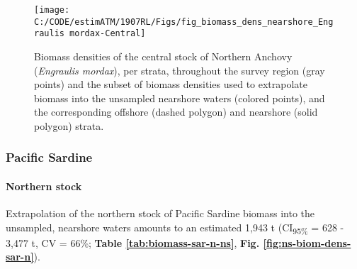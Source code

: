 \documentclass[]{article}
\let\oldparagraph\paragraph
\renewcommand{\paragraph}[1]{\oldparagraph{#1}\mbox{}}
\begin{document}
\newpage



\begin{figure}[H]

{\centering \texttt{[image: C:/CODE/estimATM/1907RL/Figs/fig\_biomass\_dens\_nearshore\_Engraulis mordax-Central]} 

}

\caption{Biomass densities of the central stock of Northern Anchovy (\emph{Engraulis mordax}), per strata, throughout the survey region (gray points) and the subset of biomass densities used to extrapolate biomass into the unsampled nearshore waters (colored points), and the corresponding offshore (dashed polygon) and nearshore (solid polygon) strata.}\label{fig:ns-biom-dens-anch-c}
\end{figure}

\newpage

\hypertarget{appendix-nearshore-biomass-sardine}{%
\subsubsection{Pacific Sardine}\label{appendix-nearshore-biomass-sardine}}

\hypertarget{appendix-nearshore-biomass-sardine-n}{%
\paragraph{Northern stock}\label{appendix-nearshore-biomass-sardine-n}}

Extrapolation of the northern stock of Pacific Sardine biomass into the unsampled, nearshore waters amounts to an estimated 1,943 t (CI\textsubscript{95\%} = 628 - 3,477 t, CV = 66\%; \textbf{Table \ref{tab:biomass-sar-n-ns}}, \textbf{Fig. \ref{fig:ns-biom-dens-sar-n}}).
\end{document}
